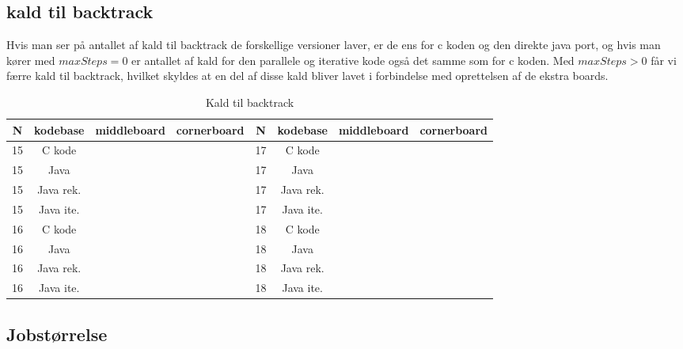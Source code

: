 \subsection{kald til backtrack}
Hvis man ser på antallet af kald til backtrack de forskellige versioner laver, er de
ens for c koden og den direkte java port, og hvis man kører med $maxSteps=0$ er
antallet af kald for den parallele og iterative kode også det samme som
for c koden. Med $maxSteps>0$ får vi færre kald til backtrack, hvilket skyldes
at en del af disse kald bliver lavet i forbindelse med oprettelsen af de ekstra
boards. 

\begin{table}
\begin{center}
\begin{tabular}{|c|c|c|c|c|c|c|c|}
\hline N  & kodebase 		  & middleboard & cornerboard & N  & kodebase      & middleboard & cornerboard \\
\hline 15 & C kode   			&             &             & 17 & C kode        &             &             \\
\hline 15 & Java          &             &             & 17 & Java          &             &             \\
\hline 15 & Java rek. &             &             & 17 & Java rek. &             &             \\
\hline 15 & Java ite. &             &             & 17 & Java ite. &             &             \\
\hline 16 & C kode   			&             &             & 18 & C kode        &             &             \\
\hline 16 & Java          &             &             & 18 & Java          &             &             \\
\hline 16 & Java rek. &             &             & 18 & Java rek. &             &             \\
\hline 16 & Java ite. &             &             & 18 & Java ite. &             &             \\
\hline
\end{tabular}
\caption{Kald til backtrack}
\label{table:backtrackkald}
\end{center}
\end{table}

\subsection{Jobstørrelse}

